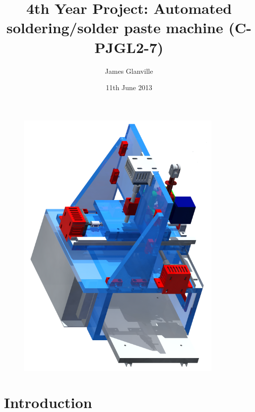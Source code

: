 \usepackage{listings}                  %
\lstset{
  basicstyle = \small
}

\providecommand{\e}[1]{\ensuremath{\times10^{#1}}}
\providecommand{\degrees}{\ensuremath{^{\circ}}}

\title{4th Year Project: Automated soldering/solder paste machine (C-PJGL2-7)} %
\author{James Glanville}
\date{11th June 2013}

\hypersetup{
    colorlinks,
    allcolors=blue,
    linktoc=all,
}



\maketitle

\begin{figure}[ht!]
\centering
\includegraphics[width=100mm]{resources/render.png}
\label{render}
\end{figure}

\newpage
\tableofcontents

\newpage

\section{Introduction}

